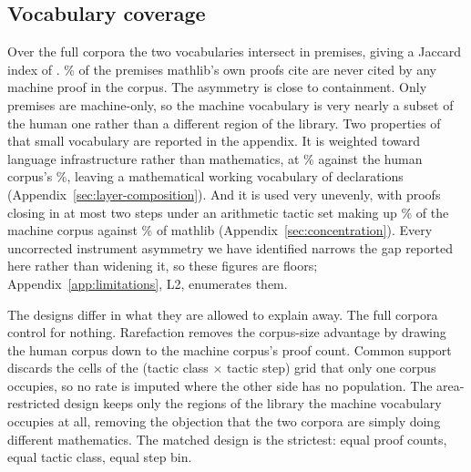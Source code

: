 
\subsection{Vocabulary coverage}
\label{sec:coverage}

Over the full corpora the two vocabularies intersect in \intersectionFull{}
premises, giving a Jaccard index of \jaccardFull{}. \humanOnlyFullPct{}\% of
the premises mathlib's own proofs cite are never cited by any machine proof in
the corpus. The asymmetry
is close to containment. Only \machineOnlyFull{} premises are machine-only, so
the machine vocabulary is very nearly a subset of the human one rather than a
different region of the library. Two properties of that small vocabulary are
reported in the appendix. It is weighted toward language infrastructure rather
than mathematics, at \machineVocabInfraPct{}\% against the human corpus's
\humanVocabInfraPct{}\%, leaving a mathematical working vocabulary of
\machineVocabMath{} declarations (Appendix~\ref{sec:layer-composition}). And
it is used very unevenly, with proofs closing in at most two steps under an
arithmetic tactic set making up \degenerateMachineSharePct{}\% of the machine
corpus against \degenerateHumanSharePct{}\% of mathlib
(Appendix~\ref{sec:concentration}). Every uncorrected instrument asymmetry we
have identified narrows the gap reported here rather than widening it, so these
figures are floors; Appendix~\ref{app:limitations}, L2, enumerates them.

The designs differ in what they are allowed to explain away. The full corpora
control for nothing. Rarefaction removes the corpus-size advantage by drawing
the human corpus down to the machine corpus's proof count. Common support
discards the cells of the (tactic class $\times$ tactic step) grid that only
one corpus occupies, so no rate is imputed where the other side has no
population. The area-restricted design keeps only the regions of the library
the machine vocabulary occupies at all, removing the objection that the two
corpora are simply doing different mathematics. The matched design is the
strictest: equal proof counts, equal tactic class, equal step bin.

